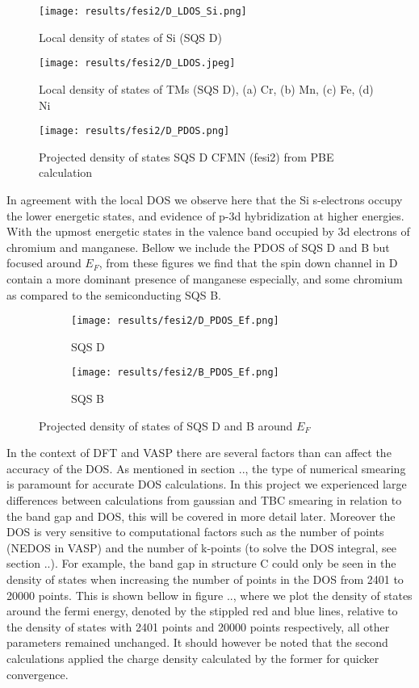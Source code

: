 \begin{figure}[H]
	\centering
	\texttt{[image: results/fesi2/D\_LDOS\_Si.png]}
	\caption{Local density of states of Si (SQS D)}
\end{figure} 

\begin{figure}[H]
	\centering
	\texttt{[image: results/fesi2/D\_LDOS.jpeg]}
	\caption{Local density of states of TMs (SQS D), (a) Cr, (b) Mn, (c) Fe, (d) Ni}
\end{figure} 

\begin{figure}[H]
	\centering
	\texttt{[image: results/fesi2/D\_PDOS.png]}
	\caption{Projected density of states SQS D CFMN (fesi2) from PBE calculation}
\end{figure} 

In agreement with the local DOS we observe here that the Si s-electrons occupy the lower energetic states, and evidence of p-3d hybridization at higher energies. With the upmost energetic states in the valence band occupied by 3d electrons of chromium and manganese. Bellow we include the PDOS of SQS D and B but focused around $E_F$, from these figures we find that the spin down channel in D contain a more dominant presence of manganese especially, and some chromium as compared to the semiconducting SQS B.  
  
\begin{figure}[H]
	\centering
	\begin{subfigure}{.45\textwidth}
			\texttt{[image: results/fesi2/D\_PDOS\_Ef.png]}
			\caption{SQS D}		
	\end{subfigure}
	\hspace{0.5cm}
	\begin{subfigure}{.45\textwidth}
		\texttt{[image: results/fesi2/B\_PDOS\_Ef.png]}
		\caption{SQS B}		
	\end{subfigure}
	\caption{Projected density of states of SQS D and B around $E_F$}
\end{figure}

In the context of DFT and VASP there are several factors than can affect the accuracy of the DOS. As mentioned in section .., the type of numerical smearing is paramount for accurate DOS calculations. In this project we experienced large differences between calculations from gaussian and TBC smearing in relation to the band gap and DOS, this will be covered in more detail later. Moreover the DOS is very sensitive to computational factors such as the number of points (NEDOS in VASP) and the number of k-points (to solve the DOS integral, see section ..). For example, the band gap in structure C could only be seen in the density of states when increasing the number of points in the DOS from 2401 to 20000 points. This is shown bellow in figure .., where we plot the density of states around the fermi energy, denoted by the stippled red and blue lines, relative to the density of states with 2401 points and 20000 points respectively, all other parameters remained unchanged. It should however be noted that the second calculations applied the charge density calculated by the former for quicker convergence. 

